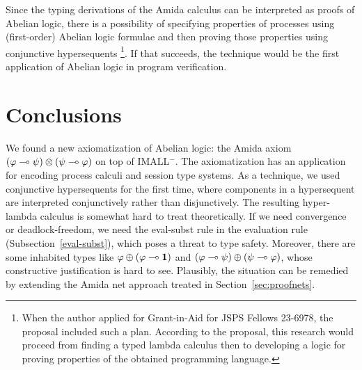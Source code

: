 Since the typing derivations of the Amida calculus can be interpreted as
proofs of Abelian logic, there is a possibility of specifying properties
of processes using (first-order) Abelian logic formulae and then
proving those properties using conjunctive hypersequents%
\footnote{When the author applied for Grant-in-Aid for JSPS Fellows
23-6978, the proposal included such a plan.  According to the proposal,
this research would proceed from finding a typed lambda calculus then to
developing a logic for proving properties of the obtained programming
language.}.
If that succeeds, the technique would be the first application of
Abelian logic in program verification.

\section{Conclusions}

We found a new axiomatization of Abelian logic: the Amida axiom
$(\varphi\multimap\psi)\otimes(\psi\multimap\varphi)$ on top of IMALL$^-$.
The axiomatization has an application for encoding process calculi and
session type systems.
As a technique, we used conjunctive hypersequents for the first time,
where components in a hypersequent are interpreted conjunctively rather
than disjunctively.
The resulting hyper-lambda calculus is somewhat hard to treat
theoretically.
If we need convergence or deadlock-freedom, we need the eval-subst rule in the evaluation rule
(Subsection~\ref{eval-subst}),
which poses a threat to type safety.
Moreover, there are some inhabited types like $\varphi\oplus
(\varphi\multimap\mathbf{1})$ and $(\varphi\multimap\psi)\oplus(\psi\multimap\varphi)$,
whose constructive justification is hard to see.
Plausibly, the situation can be remedied by extending the Amida net
approach treated in Section~\ref{sec:proofnets}.
